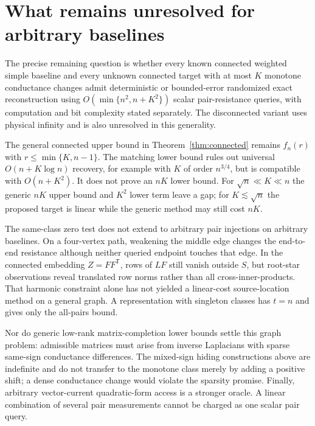 \documentclass[11pt,letterpaper]{article}
\begin{document}
\section{What remains unresolved for arbitrary baselines}
The precise remaining question is whether every known connected weighted simple baseline and every unknown connected target with at most $K$ monotone conductance changes admit deterministic or bounded-error randomized exact reconstruction using $O(\min\{n^2,n+K^2\})$ scalar pair-resistance queries, with computation and bit complexity stated separately. The disconnected variant uses physical infinity and is also unresolved in this generality.

The general connected upper bound in Theorem~\ref{thm:connected} remains $f_n(r)$ with $r\le\min\{K,n-1\}$. The matching lower bound rules out universal $O(n+K\log n)$ recovery, for example with $K$ of order $n^{3/4}$, but is compatible with $O(n+K^2)$. It does not prove an $nK$ lower bound. For $\sqrt n\ll K\ll n$ the generic $nK$ upper bound and $K^2$ lower term leave a gap; for $K\lesssim\sqrt n$ the proposed target is linear while the generic method may still cost $nK$.

The same-class zero test does not extend to arbitrary pair injections on arbitrary baselines. On a four-vertex path, weakening the middle edge changes the end-to-end resistance although neither queried endpoint touches that edge. In the connected embedding $Z=FF^{\mathsf T}$, rows of $LF$ still vanish outside $S$, but root-star observations reveal translated row norms rather than all cross-inner-products. That harmonic constraint alone has not yielded a linear-cost source-location method on a general graph. A representation with singleton classes has $t=n$ and gives only the all-pairs bound.

Nor do generic low-rank matrix-completion lower bounds settle this graph problem: admissible matrices must arise from inverse Laplacians with sparse same-sign conductance differences. The mixed-sign hiding constructions above are indefinite and do not transfer to the monotone class merely by adding a positive shift; a dense conductance change would violate the sparsity promise. Finally, arbitrary vector-current quadratic-form access is a stronger oracle. A linear combination of several pair measurements cannot be charged as one scalar pair query.
\end{document}
